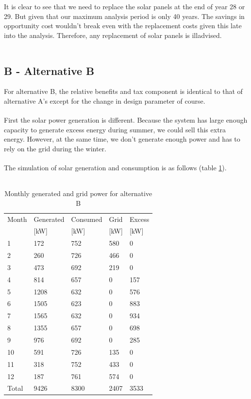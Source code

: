 \documentclass[10pt,letterpaper]{article}
\begin{document}
It is clear to see that we need to replace the solar panels at the end of year 28 or 29. But given that our maximum analysis period is only 40 years. The savings in opportunity cost wouldn't break even with the replacement costs given this late into the analysis. Therefore, any replacement of solar panels is illadvised.\\
\\

\subsection{B - Alternative B}

For alternative B, the relative benefits and tax component is identical to that of alternative A's except for the change in design parameter of course.\\
\\
First the solar power generation is different. Because the system has large enough capacity to generate excess energy during summer, we could sell this extra energy. However, at the same time, we don't generate enough power and has to rely on the grid during the winter.\\
\\
The simulation of solar generation and consumption is as follows (table \ref{table:b-generation}).\\
\\
\begin{table}[H]
	\centering
	\begin{tabular}{lllll}
		\hline
		Month & Generated & Consumed & Grid     & Excess   \\
		      & {[}kW{]}  & {[}kW{]} & {[}kW{]} & {[}kW{]} \\ \hline
		1     & 172       & 752      & 580      & 0        \\
		2     & 260       & 726      & 466      & 0        \\
		3     & 473       & 692      & 219      & 0        \\
		4     & 814       & 657      & 0        & 157      \\
		5     & 1208      & 632      & 0        & 576      \\
		6     & 1505      & 623      & 0        & 883      \\
		7     & 1565      & 632      & 0        & 934      \\
		8     & 1355      & 657      & 0        & 698      \\
		9     & 976       & 692      & 0        & 285      \\
		10    & 591       & 726      & 135      & 0        \\
		11    & 318       & 752      & 433      & 0        \\
		12    & 187       & 761      & 574      & 0        \\\hline
		Total & 9426      & 8300     & 2407     & 3533
	\end{tabular}
	\caption{Monthly generated and grid power for alternative B}
	\label{table:b-generation}
\end{table}
\end{document}
